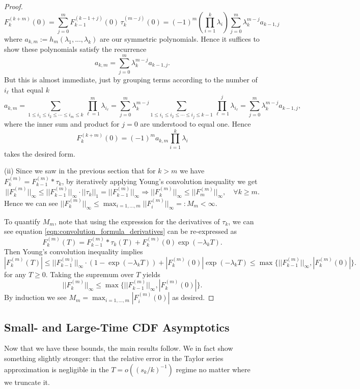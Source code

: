 \begin{subappendices}
\begin{proof}
\[F_{k}^{(k+m)}(0) = \sum_{j=0}^m F_{k-1}^{(k-1 + j)}(0)\,\tau^{(m-j)}_{k}(0) = (-1)^m \left(\prod_{i=1}^k \lambda_i\right) \sum_{j=0}^m \lambda_{k}^{m-j} a_{k-1, j} \]
%
\noindent where $a_{k, m} := h_m(\lambda_1,..., \lambda_k)$ are our symmetric polynomials. Hence it suffices to show these polynomials satisfy the recurrence
%
\[a_{k,m} = \sum_{j=0}^m \lambda_{k}^{m-j} a_{k-1, j}.\]
%
\noindent But this is almost immediate, just by grouping terms according to the number of $i_\ell$ that equal $k$
%
\[
a_{k,m}
= \sum_{1\leq i_1\leq i_2\leq\cdots\leq i_m\leq k}
    \prod_{\ell=1}^m \lambda_{i_\ell}
= \sum_{j=0}^m \lambda_k^{m-j}
    \sum_{1\leq i_1\leq i_2\leq\cdots\leq i_j\leq k-1}
    \prod_{\ell=1}^j \lambda_{i_\ell}
= \sum_{j=0}^m \lambda_k^{m-j} a_{k-1,j},
\]
where the inner sum and product for $j=0$ are understood to equal one.
%
\noindent Hence
%
    \[F_{k}^{(k+m)}(0) = (-1)^m a_{k,m} \prod_{i=1}^k \lambda_i\]
%
\noindent takes the desired form.

\noindent (ii) Since we saw in the previous section that for $k > m$ we have $F_k^{(m)} = F_{k-1}^{(m)} \ast \tau_k$, by iteratively applying Young's convolution inequality we get
%
\[ ||F_{k}^{(m)}||_\infty \leq ||F_{k-1}^{(m)}||_\infty \cdot ||\tau_k||_1 = ||F_{k-1}^{(m)}||_\infty  \Longrightarrow  ||F_{k}^{(m)}||_\infty \leq ||F_m^{(m)}||_\infty, \quad \forall k \geq m.\]
%
\noindent Hence we can see $||F_k^{(m)}||_\infty \leq \max_{i=1,...,m} ||F_i^{(m)}||_\infty =: M_m < \infty$.

To quantify $M_m$, note that using the expression for the derivatives of $\tau_k$, we can see equation \eqref{eqn:convolution_formula_derivatives} can be re-expressed as
%
\[F_k^{(m)}(T) = F_{k-1}^{(m)} \ast \tau_k(T) + F_{k}^{(m)}(0) \exp(-\lambda_k T).\]
%
\noindent Then Young's convolution inequality implies
%
\[|F_k^{(m)}(T)| \leq ||F_{k-1}^{(m)}||_\infty \cdot (1-\exp(-\lambda_k T)) + |F_{k}^{(m)}(0)| \exp(-\lambda_k T) \leq \max \{||F_{k-1}^{(m)}||_\infty, |F_{k}^{(m)}(0)|\}.\]
%
for any $T \geq 0$. Taking the supremum over $T$ yields
%
    \[||F_k^{(m)}||_\infty \leq \max \{||F_{k-1}^{(m)}||_\infty, |F_{k}^{(m)}(0)|\}.\]
%
\noindent By induction we see $M_m = \max_{i=1,..., m}|F_i^{(m)}(0)|$ as desired.
\end{proof}



\subsection{Small- and Large-Time CDF Asymptotics}
\label{app:cdf-asymptotics}
\noindent Now that we have these bounds, the main results follow. We in fact show something slightly stronger: that the relative error in the Taylor series approximation is negligible in the $T = o((s_k/k)^{-1})$ regime no matter where we truncate it.


\end{subappendices}
